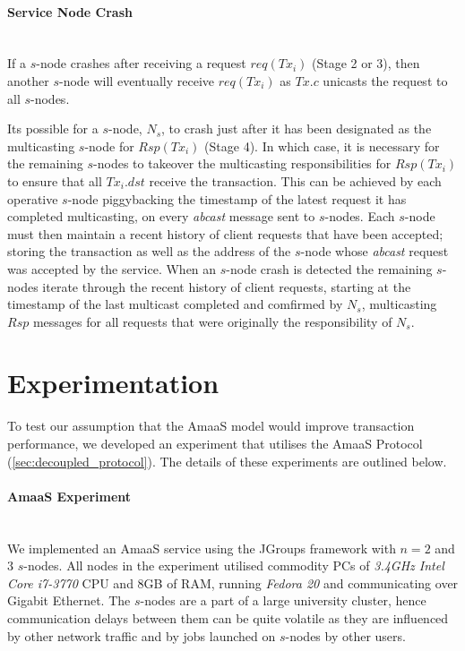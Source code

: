 	\paragraph{Service Node Crash} \hspace{0pt} \\
    If a $s$-node crashes after receiving a request $req(Tx_i)$ (Stage 2 or 3), then another $s$-node will eventually receive $req(Tx_i)$ as $Tx.c$ unicasts the request to all $s$-nodes.  
    
	Its possible for a $s$-node, $N_s$, to crash just after it has been designated as the multicasting $s$-node for $Rsp(Tx_i)$ (Stage 4).  In which case, it is necessary for the remaining $s$-nodes to takeover the multicasting responsibilities for $Rsp(Tx_i)$ to ensure that all $Tx_i.dst$ receive the transaction.  This can be achieved by each operative $s$-node piggybacking the timestamp of the latest request it has completed multicasting, on every \emph{abcast} message sent to $s$-nodes.  Each $s$-node must then maintain a recent history of client requests that have been accepted; storing the transaction as well as the address of the $s$-node whose \emph{abcast} request was accepted by the service.  When an $s$-node crash is detected the remaining $s$-nodes iterate through the recent history of client requests, starting at the timestamp of the last multicast completed and comfirmed by $N_s$, multicasting $Rsp$ messages for all requests that were originally the responsibility of $N_s$.  
	
\section{Experimentation}

To test our assumption that the \textsf{AmaaS} model would improve transaction performance, we developed an experiment that utilises the \textsf{AmaaS} Protocol (\ref{sec:decoupled_protocol}).  The details of these experiments are outlined below. 

\paragraph{AmaaS Experiment} \hspace{0pt} \\
We implemented an \textsf{AmaaS} service using the JGroups\citep{JGroups} framework with $n=2$ and $3$ $s$-nodes.  All nodes in the experiment utilised commodity PCs of \emph{3.4GHz Intel Core i7-3770} CPU and 8GB of RAM, running \emph{Fedora 20} and communicating over Gigabit Ethernet. The $s$-nodes are a part of a large university cluster, hence communication delays between them can be quite volatile as they are influenced by other network traffic and by jobs launched on $s$-nodes by other users.

